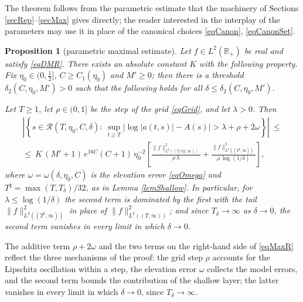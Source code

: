 \documentclass[11pt,twoside,reqno]{amsart}
\def\to{\rightarrow}
\def\R{{\mathbb R}}
\def\RR{{\mathcal{R}}}
\def\d{\delta}
\theoremstyle{plain}
\newtheorem{proposition}{Proposition}
\numberwithin{equation}{section}
\begin{document}
The theorem follows from the parametric estimate that the machinery of Sections \ref{secRep}--\ref{secMax} gives directly; the reader interested in the interplay of the parameters may use it in place of the canonical choices \eqref{eqCanon}, \eqref{eqCanonSet}.

\begin{proposition}[parametric maximal estimate]\label{propMaxPar}
Let $f\in L^2(\R_+)$ be real and satisfy \eqref{eqDMR}. There exists an absolute constant $K$ with the following property. Fix $\eta_0\in(0,\tfrac12]$, $C\geq C_1(\eta_0)$ and $M'\geq0$; then there is a threshold $\d_2(C,\eta_0,M')>0$ such that the following holds for all $\d\leq\d_2(C,\eta_0,M')$.

Let $T\geq1$, let $\rho\in(0,1]$ be the step of the grid \eqref{eqGrid}, and let $\lambda>0$. Then
\begin{equation}
\begin{gathered}
\left|\left\{s\in\RR(T,\eta_0,C,\d):\ \sup_{t\geq T}\big|\log|a(t,s)|-A(s)\big|>\lambda+\rho+2\omega\right\}\right|\ \leq\\
\leq\ K\,(M'+1)\,e^{16C}(C+1)\,\eta_0^{-2}\left[\frac{\|f\|^2_{L^2((T/32,\infty))}}{\rho\,\lambda}
+\frac{\|f\|^2_{L^2((T^\sharp,\infty))}}{\rho\,\log(1/\d)}\right],
\end{gathered}
\label{eqMaxR}
\end{equation}
where $\omega=\omega(\d,\eta_0,C)$ is the elevation error \eqref{eqOmega} and $T^\sharp=\max(T,T_\d)/32$, as in Lemma \ref{lemShallow}. In particular, for $\lambda\leq\log(1/\d)$ the second term is dominated by the first with the tail $\|f\|^2_{L^2((T^\sharp,\infty))}$ in place of $\|f\|^2_{L^2((T,\infty))}$; and since $T_\d\to\infty$ as $\d\to0$, the second term vanishes in every limit in which $\d\to0$.
\end{proposition}

The additive term $\rho+2\omega$ and the two terms on the right-hand side of \eqref{eqMaxR} reflect the three mechanisms of the proof: the grid step $\rho$ accounts for the Lipschitz oscillation within a step, the elevation error $\omega$ collects the model errors, and the second term bounds the contribution of the shallow layer; the latter vanishes in every limit in which $\d\to0$, since $T_\d\to\infty$.
\end{document}
